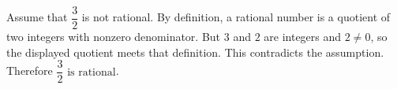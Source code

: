 Assume that $\dfrac{3}{2}$ is not rational. By definition, a rational number is a quotient of two integers with nonzero denominator. But $3$ and $2$ are integers and $2\ne0$, so the displayed quotient meets that definition. This contradicts the assumption. Therefore $\boxed{\dfrac{3}{2}\text{ is rational}}$.
